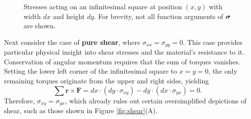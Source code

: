 \begin{figure}[htbp]
    \centering
    \caption{Stresses acting on an infinitesimal square at position $(x,y)$ with width $dx$ and height $dy$. For brevity, not all function arguments of $\boldsymbol{\sigma}$ are shown.}
    \label{fig:stress}
\end{figure}

Next consider the case of \textbf{pure shear}, where $\sigma_{xx}=\sigma_{yy}=0$. This case provides particular physical insight into shear stresses and the material's resistance to it.
Conservation of angular momentum requires that the sum of torques vanishes. Setting the lower left corner of the infinitesimal square to $x=y=0$, the only remaining torques originate from the upper and right sides, yielding
\begin{equation*}
\sum \mathbf{r}\times\mathbf{F}=dx\cdot (dy\cdot \sigma_{xy}) - dy\cdot (dx\cdot \sigma_{yx})=0.
\end{equation*}
Therefore, $\sigma_{xy}=\sigma_{yx}$, which already rules out certain oversimplified depictions of shear, such as those shown in Figure \ref{fig:shear}(A).

